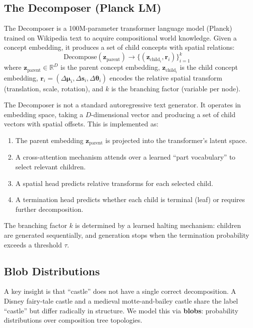 \documentclass[11pt]{article}
\begin{document}
\subsection{The Decomposer (Planck LM)}

The Decomposer is a 100M-parameter transformer language model (Planck) trained on Wikipedia text to acquire compositional world knowledge. Given a concept embedding, it produces a set of child concepts with spatial relations:
\begin{equation}
\text{Decompose}(\mathbf{z}_{\text{parent}}) \rightarrow \{(\mathbf{z}_{\text{child}_i}, \mathbf{r}_i)\}_{i=1}^{k}
\end{equation}
where $\mathbf{z}_{\text{parent}} \in \mathbb{R}^D$ is the parent concept embedding, $\mathbf{z}_{\text{child}_i}$ is the child concept embedding, $\mathbf{r}_i = (\Delta\boldsymbol{\mu}_i, \Delta\mathbf{s}_i, \Delta\boldsymbol{\theta}_i)$ encodes the relative spatial transform (translation, scale, rotation), and $k$ is the branching factor (variable per node).

The Decomposer is not a standard autoregressive text generator. It operates in embedding space, taking a $D$-dimensional vector and producing a set of child vectors with spatial offsets. This is implemented as:

\begin{enumerate}
    \item The parent embedding $\mathbf{z}_{\text{parent}}$ is projected into the transformer's latent space.
    \item A cross-attention mechanism attends over a learned ``part vocabulary'' to select relevant children.
    \item A spatial head predicts relative transforms for each selected child.
    \item A termination head predicts whether each child is terminal (leaf) or requires further decomposition.
\end{enumerate}

The branching factor $k$ is determined by a learned halting mechanism: children are generated sequentially, and generation stops when the termination probability exceeds a threshold $\tau$.

\subsection{Blob Distributions}

A key insight is that ``castle'' does not have a single correct decomposition. A Disney fairy-tale castle and a medieval motte-and-bailey castle share the label ``castle'' but differ radically in structure. We model this via \textbf{blobs}: probability distributions over composition tree topologies.
\end{document}
